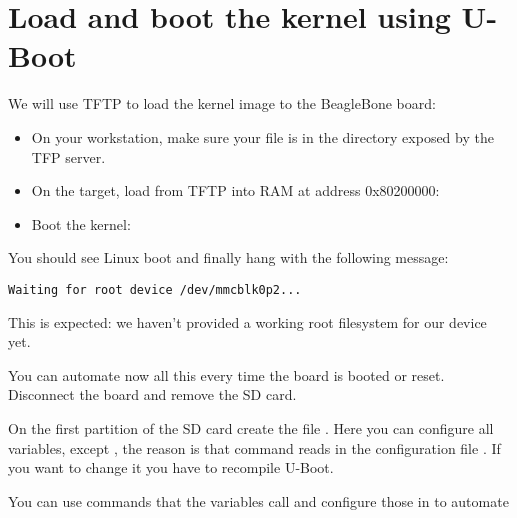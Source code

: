 \section{Load and boot the kernel using U-Boot}

We will use TFTP to load the kernel image to the BeagleBone board:

\begin{itemize}

\item On your workstation, make sure your  file is in the
  directory exposed by the TFP server.

\item On the target, load  from TFTP into RAM at address
  0x80200000:\\

\item Boot the kernel:\\

\end{itemize}

You should see Linux boot and finally hang with the following message:

\begin{verbatim}
Waiting for root device /dev/mmcblk0p2...
\end{verbatim}

This is expected: we haven't provided a working root filesystem for
our device yet.

You can automate now all this every time the board is booted or
reset. Disconnect the board and remove the SD card.

On the first partition of the SD card create the file .
Here you can configure all variables, except , the reason is that command reads in the configuration file . If you want to change it you have to recompile U-Boot.

You can use commands that the  variables call and configure those in  to automate 

